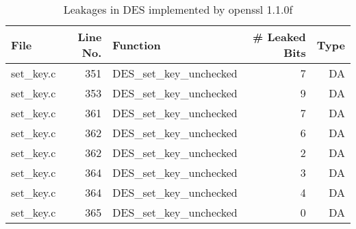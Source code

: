 \begin{table}[h!]
\centering\tiny\scriptsize
\renewcommand{\baselinestretch}{0.96}\selectfont
\caption{Leakages in DES implemented by openssl 1.1.0f}\label{tab:DESopenssl1.1.0f}
\begin{tabular}{lrlrr}
\hline
\textbf{File} & \textbf{Line No.} & \textbf{Function} & \textbf{\# Leaked Bits} & \textbf{Type} \\\hline
set\_key.c& 351&DES\_set\_key\_unchecked&7 &DA\\
set\_key.c& 353&DES\_set\_key\_unchecked&9 &DA\\
set\_key.c& 361&DES\_set\_key\_unchecked&7 &DA\\
set\_key.c& 362&DES\_set\_key\_unchecked&6 &DA\\
set\_key.c& 362&DES\_set\_key\_unchecked&2 &DA\\
set\_key.c& 364&DES\_set\_key\_unchecked&3 &DA\\
set\_key.c& 364&DES\_set\_key\_unchecked&4 &DA\\
set\_key.c& 365&DES\_set\_key\_unchecked&0 &DA\\
\hline
\end{tabular}
\renewcommand{\baselinestretch}{1.0}\selectfont
\end{table}
